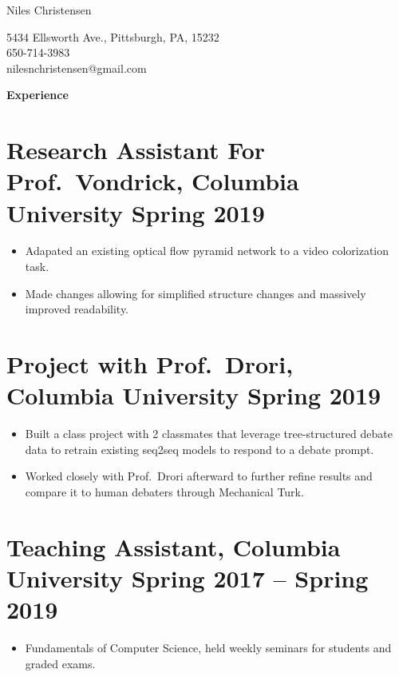 \documentclass{article}
\newenvironment{tightcenter}{%
  \setlength\topsep{0pt}
  \setlength\parskip{0pt}
  \begin{center}
}{%
  \end{center}
}
\begin{document}
\begin{tightcenter}
\begin{Large}Niles Christensen\\
\end{Large}
\begin{small}
5434 Ellsworth Ave., Pittsburgh, PA, 15232\\
650-714-3983\\
nilesnchristensen@gmail.com
\end{small}
\end{tightcenter}

\noindent
\large{\textbf{Experience}}

\section*{\textbf{Research Assistant For Prof.\ Vondrick, Columbia University \hfill	Spring 2019}}
\begin{itemize}[noitemsep]
    \item Adapated an existing optical flow pyramid network to a video colorization task.
    \item Made changes allowing for simplified structure changes and massively improved readability.
\end{itemize}

\section*{\textbf{Project with Prof.\ Drori, Columbia University \hfill Spring 2019}}
\begin{itemize}[noitemsep]
  \item Built a class project with 2 classmates that leverage tree-structured debate data to retrain existing seq2seq models to respond to a debate prompt.
  \item Worked closely with Prof.\ Drori afterward to further refine results and compare it to human debaters through Mechanical Turk.
\end{itemize}

\section*{\textbf{Teaching Assistant, Columbia University \hfill	Spring 2017 -- Spring 2019 }}
\begin{itemize}
    \item Fundamentals of Computer Science, held weekly seminars for students and graded exams.
\end{itemize}
\end{document}

